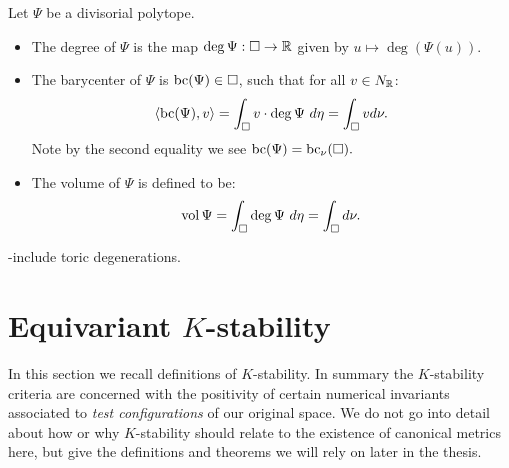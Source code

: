 \begin{definition}
Let \(\Psi\) be a divisorial polytope.
\begin{itemize}
\item The degree of \(\Psi\) is the map \( \deg \Psi : \Box \to \mathbb{R}\) given by \( u \mapsto \deg (\Psi(u))\).
\item The barycenter of \(\Psi\) is \(\mathop{\rm bc}\nolimits(\Psi) \in \Box\), such that for all \(v \in N_{\mathbb{R}}\):
\[
\langle \mathop{\rm bc}\nolimits(\Psi), v \rangle = \int_\Box v \cdot \deg \Psi \ d \eta = \int_\Box v d \nu. 
\]
Note by the second equality we see \(\mathop{\rm bc}\nolimits(\Psi) = \mathop{\rm bc}\nolimits_\nu(\Box).\)
\item The volume of \(\Psi\) is defined to be:
\[
\mathop{\rm vol}\nolimits \Psi = \int_\Box \deg \Psi \ d \eta = \int_\Box d \nu.
\]
\end{itemize}
\end{definition}

-include toric degenerations.

\section{Equivariant $K$-stability}
In this section we recall definitions of \(K\)-stability. In summary the \(K\)-stability criteria are concerned with the positivity of certain numerical invariants associated to \textit{test configurations} of our original space. We do not go into detail about how or why \(K\)-stability should relate to the existence of canonical metrics here, but give the definitions and theorems we will rely on later in the thesis.

